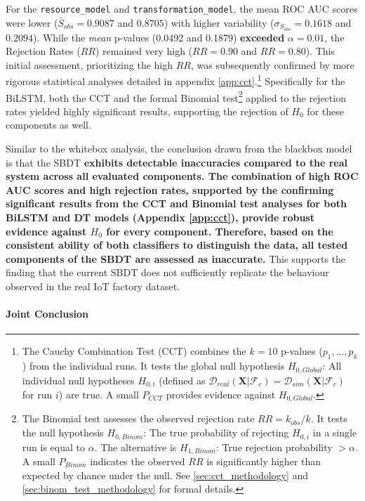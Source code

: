 For the \texttt{resource\_model} and \texttt{transformation\_model}, the mean ROC AUC scores were lower ($\bar{S}_{obs}=0.9087$ and $0.8705$) with higher variability ($\sigma_{S_{obs}}=0.1618$ and $0.2094$). While the \textit{mean} p-values (0.0492 and 0.1879) \textbf{exceeded} $\alpha=0.01$, the Rejection Rates ($RR$) remained very high ($RR=0.90$ and $RR=0.80$). This initial assessment, prioritizing the high $RR$, was subsequently confirmed by more rigorous statistical analyses detailed in appendix \autoref{app:cct}.\footnote{The Cauchy Combination Test (CCT) combines the $k=10$ p-values ($p_1, ..., p_k$) from the individual runs. It tests the global null hypothesis $H_{0,Global}$: All individual null hypotheses $H_{0,i}$ (defined as $\mathcal{D}_{real}(\mathbf{X} | \mathcal{F}_c) = \mathcal{D}_{sim}(\mathbf{X} | \mathcal{F}_c)$ for run $i$) are true. A small $P_{CCT}$ provides evidence against $H_{0,Global}$.}  Specifically for the BiLSTM, both the CCT and the formal Binomial test\footnote{The Binomial test assesses the observed rejection rate $RR = k_{obs}/k$. It tests the null hypothesis $H_{0,Binom}$: The true probability of rejecting $H_{0,i}$ in a single run is equal to $\alpha$. The alternative is $H_{1,Binom}$: True rejection probability $> \alpha$. A small $P_{Binom}$ indicates the observed $RR$ is significantly higher than expected by chance under the null. See \autoref{sec:cct_methodology} and \autoref{sec:binom_test_methodology} for formal details.} applied to the rejection rates yielded highly significant results, supporting the rejection of $H_0$ for these components as well.

Similar to the whitebox analysis, the conclusion drawn from the blackbox model is that the SBDT \textbf{exhibits detectable inaccuracies compared to the real system across all evaluated components. The combination of high ROC AUC scores and high rejection rates, supported by the confirming significant results from the CCT and Binomial test analyses for both BiLSTM and DT models (Appendix \ref{app:cct}), provide robust evidence against $H_0$ for every component. Therefore, based on the consistent ability of both classifiers to distinguish the data, all tested components of the SBDT are assessed as inaccurate.} This supports the finding that the current SBDT does not sufficiently replicate the behaviour observed in the real IoT factory dataset.

\paragraph{Joint Conclusion}

